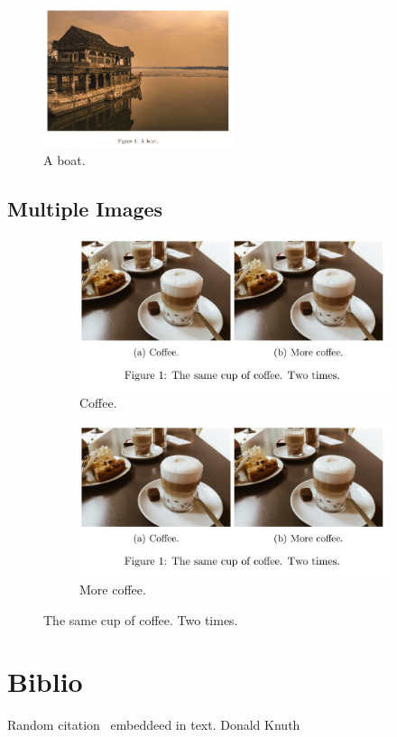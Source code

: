 \documentclass{article}
\begin{document}
\begin{figure}[h!]
    \includegraphics[width=0.5\textwidth]{boat.png}
    \caption{A boat.}
    \label{fig:boat1}
  \end{figure}
  

  \subsection{Multiple Images}

\begin{figure}[h!]
    \centering
    \begin{subfigure}[b]{0.4\linewidth}
      \includegraphics[width=\linewidth]{coffee.jpg}
      \caption{Coffee.}
    \end{subfigure}
    \begin{subfigure}[b]{0.4\linewidth}
      \includegraphics[width=\linewidth]{coffee.jpg}
      \caption{More coffee.}
    \end{subfigure}
    \caption{The same cup of coffee. Two times.}
    \label{fig:coffee}
  \end{figure}
  
  \section{Biblio}
  Random citation~\cite{DUMMY:1} embeddeed in text.
  Donald Knuth~\cite{don}


   
  
\end{document}
